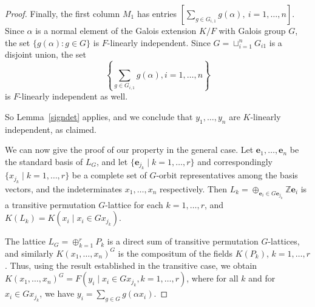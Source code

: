 \documentclass[12pt]{article}
\theoremstyle{plain}
\newcommand{\Z}{\ensuremath{\mathbb{Z}}}
\begin{document}
\begin{proof}
  Finally, the first column $M_1$ has entries $[ \sum_{g \in
      G_{i,1}}g(\alpha),\ i = 1, \ldots,n ].$ Since $\alpha$ is a
  normal element of the Galois extension $K/F$ with Galois group $G$,
  the set $\lbrace g(\alpha): g \in G \rbrace$ is $F$-linearly
  independent. Since $G = \sqcup^n_{i =1}G_{i1}$ is a disjoint union,
  the set
  $$\left\lbrace \sum_{g \in G_{i,1}}g(\alpha), i = 1, \ldots, n \right\rbrace$$ is
  $F$-linearly independent as well.
  
  So Lemma~\ref{signdet} applies, and we conclude that $y_1, \ldots,
  y_n$ are $K$-linearly independent, as claimed.

  \medskip 
  
  We can now give the proof of our property in the general case.
  Let $\textbf{e}_1, \ldots , \textbf{e}_n$ be the standard basis of
  $L_G$, and let $\{\textbf{e}_{j_k} \mid k = 1, \ldots, r\}$ and
  correspondingly $\{x_{j_k} \mid k = 1, \ldots, r\}$ be a complete set
  of $G$-orbit representatives among the basis vectors, and the
  indeterminates $x_1, \ldots, x_n$ respectively. Then $L_k = \oplus_{
    \textbf{e}_i \in G \textbf{e}_{j_{k}} } \Z \textbf{e}_i$ is a
  transitive permutation $G$-lattice for each $k = 1, \ldots, r$, and
  $K(L_k) = K(x_i \mid x_i \in Gx_{j_k})$.
  
  The lattice $L_G = \oplus^r_{k =1} P_k$ is a direct sum of transitive
  permutation $G$-lattices, and similarly $K(x_1,\dots,x_n)^G$ is the
  compositum of the fields $K(P_k)$, $k=1,\dots,r$. Thus, using the 
  result established in the transitive case, we obtain
  $K(x_1,\dots,x_n)^G=F(y_i \mid x_i \in Gx_{j_k}, k=1,\dots,r)$, where
  for all $k$ and for $x_i \in Gx_{j_k}$, we have $y_i=\sum_{g \in G}
  g(\alpha x_i)$.
\end{proof}
\end{document}
